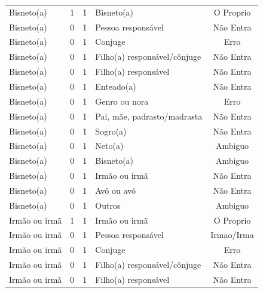 \documentclass[
	12pt,				%
	openright,			%
	twoside,			%
	a4paper,			%
	english,			%
	french,				%
	spanish,			%
	brazil				%
	]{abntex2}
\begin{document}
\begin{anexosenv}
\begin{longtable}{@{}lcclc@{}}
Bisneto(a)                   & 1         & 1        & Bisneto(a)                   & O Proprio       \\
Bisneto(a)                   & 0         & 1        & Pessoa responsável           & Não Entra       \\
Bisneto(a)                   & 0         & 1        & Conjuge                      & Erro            \\
Bisneto(a)                   & 0         & 1        & Filho(a) responsável/cônjuge & Não Entra       \\
Bisneto(a)                   & 0         & 1        & Filho(a) responsável         & Não Entra       \\
Bisneto(a)                   & 0         & 1        & Enteado(a)                   & Não Entra       \\
Bisneto(a)                   & 0         & 1        & Genro ou nora                & Erro            \\
Bisneto(a)                   & 0         & 1        & Pai, mãe, padrasto/madrasta  & Não Entra       \\
Bisneto(a)                   & 0         & 1        & Sogro(a)                     & Não Entra       \\
Bisneto(a)                   & 0         & 1        & Neto(a)                      & Ambiguo         \\
Bisneto(a)                   & 0         & 1        & Bisneto(a)                   & Ambiguo         \\
Bisneto(a)                   & 0         & 1        & Irmão ou irmã                & Não Entra       \\
Bisneto(a)                   & 0         & 1        & Avô ou avó                   & Não Entra       \\
Bisneto(a)                   & 0         & 1        & Outros                       & Ambiguo         \\
Irmão ou irmã                & 1         & 1        & Irmão ou irmã                & O Proprio       \\
Irmão ou irmã                & 0         & 1        & Pessoa responsável           & Irmao/Irma      \\
Irmão ou irmã                & 0         & 1        & Conjuge                      & Erro            \\
Irmão ou irmã                & 0         & 1        & Filho(a) responsável/cônjuge & Não Entra       \\
Irmão ou irmã                & 0         & 1        & Filho(a) responsável         & Não Entra       \\

\end{longtable}
\end{anexosenv}
\end{document}
